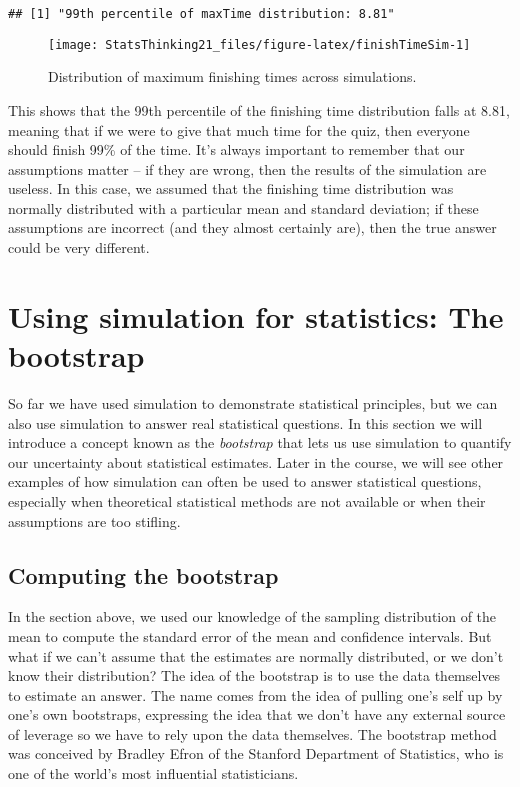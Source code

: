 \documentclass[]{book}
\theoremstyle{definition}
\theoremstyle{definition}
\theoremstyle{definition}
\theoremstyle{remark}
\begin{document}
\begin{verbatim}
## [1] "99th percentile of maxTime distribution: 8.81"
\end{verbatim}

\begin{figure}
\texttt{[image: StatsThinking21\_files/figure-latex/finishTimeSim-1]} \caption{Distribution of maximum finishing times across simulations.}\label{fig:finishTimeSim}
\end{figure}

This shows that the 99th percentile of the finishing time distribution
falls at 8.81, meaning that if we were to give that much time for the
quiz, then everyone should finish 99\% of the time. It's always
important to remember that our assumptions matter -- if they are wrong,
then the results of the simulation are useless. In this case, we assumed
that the finishing time distribution was normally distributed with a
particular mean and standard deviation; if these assumptions are
incorrect (and they almost certainly are), then the true answer could be
very different.

\section{Using simulation for statistics: The
bootstrap}\label{using-simulation-for-statistics-the-bootstrap}

So far we have used simulation to demonstrate statistical principles,
but we can also use simulation to answer real statistical questions. In
this section we will introduce a concept known as the \emph{bootstrap}
that lets us use simulation to quantify our uncertainty about
statistical estimates. Later in the course, we will see other examples
of how simulation can often be used to answer statistical questions,
especially when theoretical statistical methods are not available or
when their assumptions are too stifling.

\subsection{Computing the bootstrap}\label{computing-the-bootstrap}

In the section above, we used our knowledge of the sampling distribution
of the mean to compute the standard error of the mean and confidence
intervals. But what if we can't assume that the estimates are normally
distributed, or we don't know their distribution? The idea of the
bootstrap is to use the data themselves to estimate an answer. The name
comes from the idea of pulling one's self up by one's own bootstraps,
expressing the idea that we don't have any external source of leverage
so we have to rely upon the data themselves. The bootstrap method was
conceived by Bradley Efron of the Stanford Department of Statistics, who
is one of the world's most influential statisticians.
\end{document}
